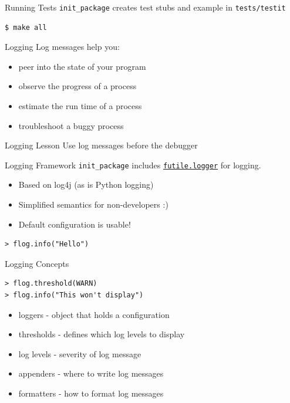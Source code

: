 \documentclass{beamer}
\begin{document}
\begin{frame}[fragile]{Running Tests}
\lstinline|init_package| creates test stubs and example 
in \lstinline|tests/testit|

\begin{lstlisting}
$ make all
\end{lstlisting}
\end{frame}



\begin{frame}[fragile]{Logging}
Log messages help you:

\begin{itemize}
\item peer into the state of your program
\item observe the progress of a process
\item estimate the run time of a process
\item troubleshoot a buggy process
\end{itemize}
\end{frame}


\begin{frame}{Logging Lesson}
\centering
\huge
\alert{Use log messages before the debugger}
\end{frame}

\begin{frame}[fragile]{Logging Framework}
\lstinline|init_package| includes 
\href{https://github.com/zatonovo/futile.logger}{\lstinline|futile.logger|}
for logging.

\begin{itemize}
\item Based on log4j (as is Python logging)
\item Simplified semantics for non-developers :)
\item Default configuration is usable!
\end{itemize}

\begin{lstlisting}
> flog.info("Hello")
\end{lstlisting}
\end{frame}


\begin{frame}[fragile]{Logging Concepts}

\begin{lstlisting}
> flog.threshold(WARN)
> flog.info("This won't display")
\end{lstlisting}

\begin{itemize}
\item loggers - object that holds a configuration
\item thresholds - defines which log levels to display
\item log levels - severity of log message
\item appenders - where to write log messages
\item formatters - how to format log messages
\end{itemize}

\end{frame}
\end{document}
